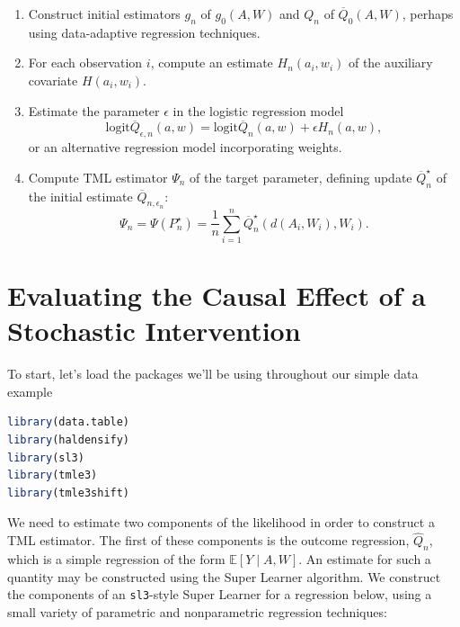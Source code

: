 \documentclass[
  12pt, krantz2,
]{krantz}
\newcommand{\passthrough}[1]{#1}
\providecommand{\tightlist}{%
  \setlength{\itemsep}{0pt}\setlength{\parskip}{0pt}}
\theoremstyle{definition}
\theoremstyle{definition}
\theoremstyle{definition}
\newcommand{\E}{\mathbb{E}}
\newcommand{\1}{\mathbbm{1}}
\begin{document}
\begin{enumerate}
\def\labelenumi{\arabic{enumi}.}
\tightlist
\item
  Construct initial estimators \(g_n\) of \(g_0(A, W)\) and \(Q_n\) of
  \(\overline{Q}_0(A, W)\), perhaps using data-adaptive regression techniques.
\item
  For each observation \(i\), compute an estimate \(H_n(a_i, w_i)\) of the
  auxiliary covariate \(H(a_i,w_i)\).
\item
  Estimate the parameter \(\epsilon\) in the logistic regression model
  \[ \text{logit}\overline{Q}_{\epsilon, n}(a, w) =
  \text{logit}\overline{Q}_n(a, w) + \epsilon H_n(a, w),\]
  or an alternative regression model incorporating weights.
\item
  Compute TML estimator \(\Psi_n\) of the target parameter, defining update
  \(\overline{Q}_n^{\star}\) of the initial estimate
  \(\overline{Q}_{n, \epsilon_n}\):
  \begin{equation}
    \Psi_n = \Psi(P_n^{\star}) = \frac{1}{n} \sum_{i = 1}^n
    \overline{Q}_n^{\star}(d(A_i, W_i), W_i).
    \label{eq:tmle}
  \end{equation}
\end{enumerate}

\hypertarget{evaluating-the-causal-effect-of-a-stochastic-intervention}{%
\section{Evaluating the Causal Effect of a Stochastic Intervention}\label{evaluating-the-causal-effect-of-a-stochastic-intervention}}

To start, let's load the packages we'll be using throughout our simple data example

\begin{lstlisting}[language=R]
library(data.table)
library(haldensify)
library(sl3)
library(tmle3)
library(tmle3shift)
\end{lstlisting}

We need to estimate two components of the likelihood in order to construct a TML
estimator. The first of these components is the outcome regression, \(\hat{Q}_n\),
which is a simple regression of the form \(\E[Y \mid A,W]\). An estimate
for such a quantity may be constructed using the Super Learner algorithm. We
construct the components of an \passthrough{\lstinline!sl3!}-style Super Learner for a regression below,
using a small variety of parametric and nonparametric regression techniques:
\end{document}
